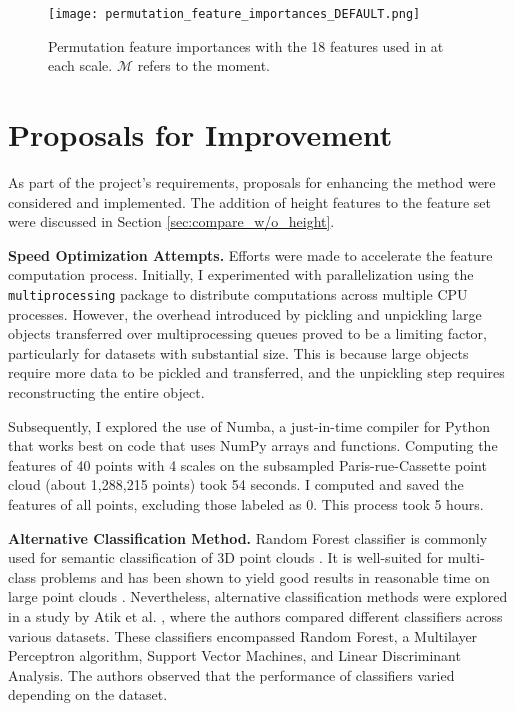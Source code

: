 \documentclass{article}
\begin{document}
\begin{figure}
    \hspace*{-2cm}
    \texttt{[image: permutation\_feature\_importances\_DEFAULT.png]}
    \caption{Permutation feature importances with the 18 features used in \cite{thomas_semantic_2018} at each scale. $\mathcal{M}$ refers to the moment.}
    \label{fig:permutation_default}
\end{figure}

\section{Proposals for Improvement}\label{sec:classification}

As part of the project's requirements, proposals for enhancing the method were considered and implemented. The addition of height features to the feature set were discussed in Section \ref{sec:compare_w/o_height}.

\textbf{Speed Optimization Attempts.} Efforts were made to accelerate the feature computation process. Initially, I experimented with parallelization using the \texttt{multiprocessing} package to distribute computations across multiple CPU processes. However, the overhead introduced by pickling and unpickling large objects transferred over multiprocessing queues proved to be a limiting factor, particularly for datasets with substantial size. This is because large objects require more data to be pickled and transferred, and the unpickling step requires reconstructing the entire object. 

Subsequently, I explored the use of Numba, a just-in-time compiler for Python that works best on code that uses NumPy arrays and functions. Computing the features of 40 points with 4 scales on the subsampled Paris-rue-Cassette point cloud (about 1,288,215 points) took 54 seconds. I computed and saved the features of all points, excluding those labeled as 0. This process took 5 hours.

\textbf{Alternative Classification Method.} Random Forest classifier is commonly used for semantic classification of 3D point clouds \cite{thomas_semantic_2018,hackel_fast_nodate}. It is well-suited for multi-class problems and has been shown to yield good results in reasonable time on large point clouds \cite{weinmann_semantic_2015,atik_machine_2021}. Nevertheless, alternative classification methods were explored in a study by Atik et al. \cite{atik_machine_2021}, where the authors compared different classifiers across various datasets. These classifiers encompassed Random Forest, a Multilayer Perceptron algorithm, Support Vector Machines, and Linear Discriminant Analysis. The authors observed that the performance of classifiers varied depending on the dataset.
\end{document}
